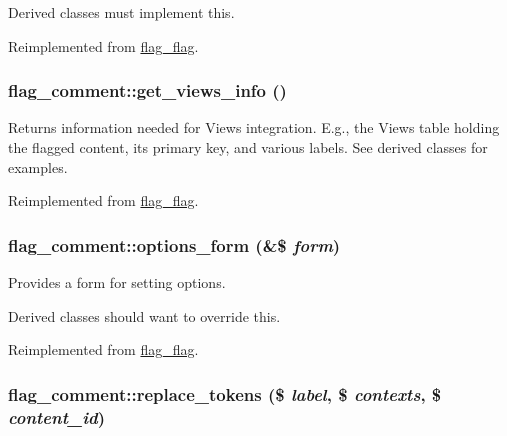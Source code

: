 Derived classes must implement this.

Reimplemented from \hyperlink{group__actions_g8f1b472c7f072dbfa682cc5b3fac9be6}{flag\_\-flag}.\hypertarget{classflag__comment_e3f7ebade72b8cdac4042de702d2978b}{
\subsubsection[{get\_\-views\_\-info}]{\setlength{\rightskip}{0pt plus 5cm}flag\_\-comment::get\_\-views\_\-info ()}}
\label{classflag__comment_e3f7ebade72b8cdac4042de702d2978b}


Returns information needed for Views integration. E.g., the Views table holding the flagged content, its primary key, and various labels. See derived classes for examples. 

Reimplemented from \hyperlink{group__views_g91f53a4d24f7c81f8a913e56154821c0}{flag\_\-flag}.\hypertarget{classflag__comment_6497f5efb8c81036572b81b91736dfea}{
\subsubsection[{options\_\-form}]{\setlength{\rightskip}{0pt plus 5cm}flag\_\-comment::options\_\-form (\&\$ {\em form})}}
\label{classflag__comment_6497f5efb8c81036572b81b91736dfea}


Provides a form for setting options.

Derived classes should want to override this. 

Reimplemented from \hyperlink{classflag__flag_28aec91da5bc068c6c2a9a707ef62345}{flag\_\-flag}.\hypertarget{classflag__comment_6dc6170aac5518de159741316a38e6bf}{
\subsubsection[{replace\_\-tokens}]{\setlength{\rightskip}{0pt plus 5cm}flag\_\-comment::replace\_\-tokens (\$ {\em label}, \/  \$ {\em contexts}, \/  \$ {\em content\_\-id})}}
\label{classflag__comment_6dc6170aac5518de159741316a38e6bf}


